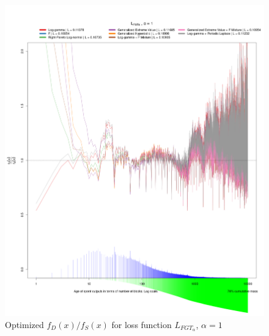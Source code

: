 \documentclass[english]{article}
\begin{document}
\begin{figure}
\caption{Optimized $f_{D}(x)/f_{S}(x)$ for loss function $L_{FGT_{\alpha}}$,
$\alpha=1$}

\includegraphics[scale=0.35]{images/dry-run/estimate-div-target/estimate-div-target-L_FGT-flavor-1}
\end{figure}
\end{document}
